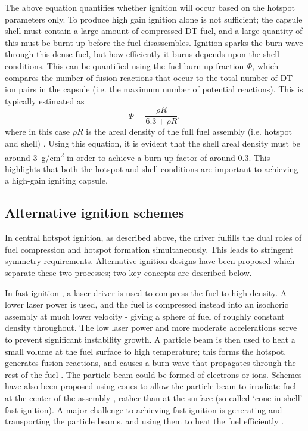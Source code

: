 The above equation quantifies whether ignition will occur based on the hotspot parameters only. To produce high gain ignition alone is not sufficient; the capsule shell must contain a large amount of compressed DT fuel, and a large quantity of this must be burnt up before the fuel disassembles. Ignition sparks the burn wave through this dense fuel, but how efficiently it burns depends upon the shell conditions. This can be quantified using the fuel burn-up fraction $\Phi$, which compares the number of fusion reactions that occur to the total number of DT ion pairs in the capsule (i.e. the maximum number of potential reactions). This is typically estimated as 
\begin{equation} \Phi = \frac{ \rho R} {6.3 + \rho R}, \end{equation}
where in this case $\rho R$ is the areal density of the full fuel assembly (i.e. hotspot and shell) \cite{Fraley1974}. Using this equation, it is evident that the shell areal density must be around 3~\si[per-mode=symbol]{\gram\per\centi\meter\squared} in order to achieve a burn up factor of around 0.3. This highlights that both the hotspot and shell conditions are important to achieving a high-gain igniting capsule.

\subsection{Alternative ignition schemes}
In central hotspot ignition, as described above, the driver fulfills the dual roles of fuel compression and hotspot formation simultaneously. This leads to stringent symmetry requirements. Alternative ignition designs have been proposed which separate these two processes; two key concepts are described below.

In fast ignition \cite{Tabak1994}, a laser driver is used to compress the fuel to high density. A lower laser power is used, and the fuel is compressed instead into an isochoric assembly at much lower velocity - giving a sphere of fuel of roughly constant density throughout. The low laser power and more moderate accelerations serve to prevent significant instability growth. A particle beam is then used to heat a small volume at the fuel surface to high temperature; this forms the hotspot, generates fusion reactions, and causes a burn-wave that propagates through the rest of the fuel \cite{Tabak2005, Tabak2006}. The particle beam could be formed of electrons or ions. Schemes have also been proposed using cones to allow the particle beam to irradiate fuel at the center of the assembly \cite{Kodama2002, Kitagawa2002}, rather than at the surface (so called `cone-in-shell' fast ignition). A major challenge to achieving fast ignition is generating and transporting the particle beams, and using them to heat the fuel efficiently \cite{Norreys2014}.

